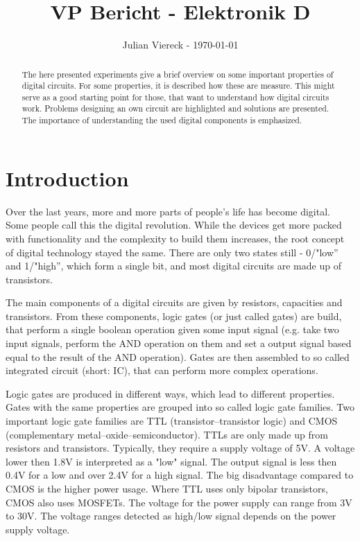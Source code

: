 \documentclass[journal]{IEEEtran}
\title{VP Bericht - Elektronik D}
\author{Julian Viereck - \today}
\begin{document}
\maketitle

\begin{abstract}The here presented experiments give a brief overview on some
important properties of digital circuits. For some properties, it is
described how these are measure. This might serve as a good starting point for
those, that want to understand how digital circuits work.
Problems designing an own circuit are highlighted and solutions are presented.
The importance of understanding the used digital components is emphasized.    
\end{abstract}

\tableofcontents

\section{Introduction}

Over the last years, more and more parts of people's life has become digital.
Some people call this the digital revolution. While the devices get more
packed with functionality and the complexity to build them increases, the root
concept of digital technology stayed the same. There are only two states  still
- 0/"low'' and 1/"high'', which form a single bit, and most digital circuits are
made up of transistors.

The main components of a digital circuits are given by resistors, capacities and
transistors. From these components, logic gates (or just called gates) are
build, that perform a single boolean operation given some input signal (e.g.
take two input signals, perform the AND operation on them and set a output
signal based equal to the result of the AND operation). Gates are then
assembled to so called integrated circuit (short: IC), that can perform more
complex operations.

Logic gates are produced in different ways, which lead to different properties.
Gates with the same properties are grouped into so called logic gate families.
Two important logic gate families are TTL (transistor–transistor logic) and CMOS
(complementary metal–oxide–semiconductor). TTLs are only made up from resistors and
transistors. Typically, they require a supply voltage of 5V. A voltage lower
then 1.8V is interpreted as a "low" signal. The output signal is less then 0.4V
for a low and over 2.4V for a high signal. The big disadvantage compared
to CMOS is the higher power usage. Where TTL uses only bipolar transistors, CMOS also uses
MOSFETs. The voltage for the power supply can range from 3V to 30V. The voltage
ranges detected as high/low signal depends on the power supply voltage.
\end{document}
